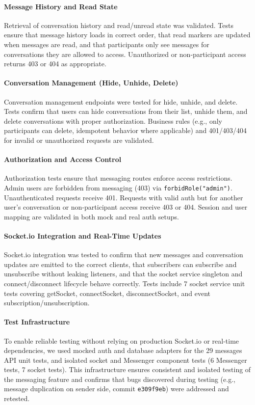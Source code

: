 \documentclass[11pt]{article}
\begin{document}
\paragraph{Message History and Read State}
Retrieval of conversation history and read/unread state was validated. Tests ensure that message history loads in correct order, that read markers are updated when messages are read, and that participants only see messages for conversations they are allowed to access. Unauthorized or non-participant access returns 403 or 404 as appropriate.

\paragraph{Conversation Management (Hide, Unhide, Delete)}
Conversation management endpoints were tested for hide, unhide, and delete. Tests confirm that users can hide conversations from their list, unhide them, and delete conversations with proper authorization. Business rules (e.g., only participants can delete, idempotent behavior where applicable) and 401/403/404 for invalid or unauthorized requests are validated.

\paragraph{Authorization and Access Control}
Authorization tests ensure that messaging routes enforce access restrictions. Admin users are forbidden from messaging (403) via \texttt{forbidRole("admin")}. Unauthenticated requests receive 401. Requests with valid auth but for another user's conversation or non-participant access receive 403 or 404. Session and user mapping are validated in both mock and real auth setups.

\paragraph{Socket.io Integration and Real-Time Updates}
Socket.io integration was tested to confirm that new messages and conversation updates are emitted to the correct clients, that subscribers can subscribe and unsubscribe without leaking listeners, and that the socket service singleton and connect/disconnect lifecycle behave correctly. Tests include 7 socket service unit tests covering getSocket, connectSocket, disconnectSocket, and event subscription/unsubscription.

\paragraph{Test Infrastructure}
To enable reliable testing without relying on production Socket.io or real-time dependencies, we used mocked auth and database adapters for the 29 messages API unit tests, and isolated socket and Messenger component tests (6 Messenger tests, 7 socket tests). This infrastructure ensures consistent and isolated testing of the messaging feature and confirms that bugs discovered during testing (e.g., message duplication on sender side, commit \texttt{e309f9eb}) were addressed and retested.
\end{document}
